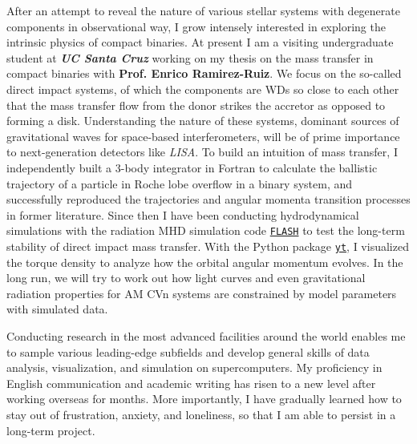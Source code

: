 After an attempt to reveal the nature of various stellar systems with degenerate components in observational way, I grow intensely interested in exploring the intrinsic physics of compact binaries. At present I am a visiting undergraduate student at \textbf{\textit{UC Santa Cruz}} working on my thesis on the mass transfer in compact binaries with \textbf{Prof. Enrico Ramirez-Ruiz}. We focus on the so-called direct impact systems, of which the components are WDs so close to each other that the mass transfer flow from the donor strikes the accretor as opposed to forming a disk. Understanding the nature of these systems, dominant sources of gravitational waves for space-based interferometers, will be of prime importance to next-generation detectors like \textit{LISA}. To build an intuition of mass transfer, I independently built a 3-body integrator in Fortran to calculate the ballistic trajectory of a particle in Roche lobe overflow in a binary system, and successfully reproduced the trajectories and angular momenta transition processes in former literature. Since then I have been conducting hydrodynamical simulations with the radiation MHD simulation code \href{http://flash.uchicago.edu/site/}{\texttt{FLASH}} to test the long-term stability of direct impact mass transfer. With the Python package \href{https://yt-project.org}{\texttt{yt}}, I visualized the torque density to analyze how the orbital angular momentum evolves. In the long run, we will try to work out how light curves and even gravitational radiation properties for AM CVn systems are constrained by model parameters with simulated data.

Conducting research in the most advanced facilities around the world enables me to sample various leading-edge subfields and develop general skills of data analysis, visualization, and simulation on supercomputers. My proficiency in English communication and academic writing has risen to a new level after working overseas for months. More importantly, I have gradually learned how to stay out of frustration, anxiety, and loneliness, so that I am able to persist in a long-term project.
